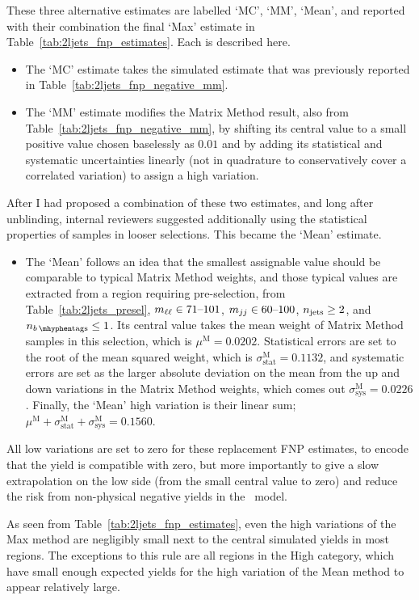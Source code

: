 These three alternative estimates are labelled `MC', `MM', `Mean', and
reported with their combination the final `Max' estimate in
Table~\ref{tab:2ljets_fnp_estimates}.
Each is described here.
\begin{itemize}
\item The `MC' estimate takes the simulated estimate that was previously reported
in Table~\ref{tab:2ljets_fnp_negative_mm}.
\item The `MM' estimate modifies the Matrix Method result,
also from Table~\ref{tab:2ljets_fnp_negative_mm}, by shifting its central
value to a small positive value chosen baselessly as $0.01$ and by adding
its statistical and systematic uncertainties linearly
(not in quadrature to conservatively cover a correlated variation)
to assign a high variation.
\end{itemize}
After I had proposed a combination of these two estimates, and long after
unblinding, internal reviewers suggested additionally using the statistical
properties of samples in looser selections.
This became the `Mean' estimate.
\begin{itemize}
\item The `Mean' follows an idea that the smallest assignable value should
be comparable to typical Matrix Method weights, and those typical values
are extracted from a region requiring pre-selection,
from Table~\ref{tab:2ljets_presel},
$m_{\ell\ell} \in 71\textrm{--}101$,
$m_{jj} \in 60\textrm{--}100$,
$n_\mathrm{jets} \geq 2$, and
$\nbtag \leq 1$.
Its central value takes the mean weight of Matrix Method samples in this
selection, which is $\mu^\textrm{M} = 0.0202$.
Statistical errors are set to the root of the mean squared weight,
which is $\sigma^\textrm{M}_\textrm{stat} = 0.1132$,
and systematic errors are set as the larger absolute deviation on the mean
from the up and down variations in the Matrix Method weights, which comes out
$\sigma^\textrm{M}_\textrm{sys} = 0.0226$.
Finally, the `Mean' high variation is their linear sum;
$\mu^\textrm{M} + \sigma^\textrm{M}_\textrm{stat} +
\sigma^\textrm{M}_\textrm{sys} = 0.1560$.
\end{itemize}
All low variations are set to zero for these replacement FNP estimates, to
encode that the yield is compatible with zero, but more importantly to give
a slow extrapolation on the low side (from the small central value to zero)
and reduce the risk from non-physical negative yields in the \histfactory\
model.

As seen from Table~\ref{tab:2ljets_fnp_estimates}, even the high variations of
the Max method are negligibly small next to the central simulated yields
in most regions.
The exceptions to this rule are all regions in the High category,
which have small enough expected yields for the high variation of the Mean
method to appear relatively large.

